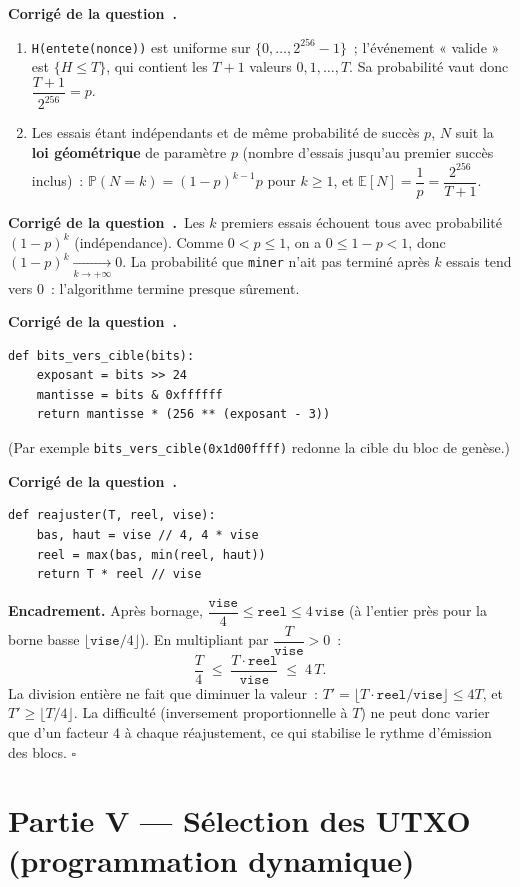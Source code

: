 \documentclass[11pt,a4paper]{article}
\newcounter{qcnt}
\newcommand{\Q}{\medskip\par\stepcounter{qcnt}\noindent\textbf{Corrigé de la question~\theqcnt.}~}
\newcommand{\code}[1]{\lstinline!#1!}
\begin{document}
\Q
\begin{enumerate}[label=(\alph*),nosep,leftmargin=1.6em]
  \item \code{H(entete(nonce))} est uniforme sur $\{0,\ldots,2^{256}-1\}$~; l'événement « valide » est $\{H\le T\}$, qui contient les $T+1$ valeurs $0,1,\ldots,T$. Sa probabilité vaut donc $\dfrac{T+1}{2^{256}} = p$.
  \item Les essais étant indépendants et de même probabilité de succès $p$, $N$ suit la \textbf{loi géométrique} de paramètre $p$ (nombre d'essais jusqu'au premier succès inclus)~: $\mathbb{P}(N=k) = (1-p)^{k-1}p$ pour $k\ge 1$, et $\mathbb{E}[N] = \dfrac{1}{p} = \dfrac{2^{256}}{T+1}$.
\end{enumerate}

\Q Les $k$ premiers essais échouent tous avec probabilité $(1-p)^{k}$ (indépendance). Comme $0<p\le 1$, on a $0\le 1-p<1$, donc $(1-p)^{k}\xrightarrow[k\to+\infty]{}0$. La probabilité que \code{miner} n'ait pas terminé après $k$ essais tend vers $0$~: l'algorithme termine presque sûrement.

\Q
\begin{lstlisting}
def bits_vers_cible(bits):
    exposant = bits >> 24
    mantisse = bits & 0xffffff
    return mantisse * (256 ** (exposant - 3))
\end{lstlisting}
(Par exemple \code{bits_vers_cible(0x1d00ffff)} redonne la cible du bloc de genèse.)

\Q
\begin{lstlisting}
def reajuster(T, reel, vise):
    bas, haut = vise // 4, 4 * vise
    reel = max(bas, min(reel, haut))
    return T * reel // vise
\end{lstlisting}
\textbf{Encadrement.} Après bornage, $\dfrac{\texttt{vise}}{4} \le \texttt{reel} \le 4\,\texttt{vise}$ (à l'entier près pour la borne basse $\lfloor\texttt{vise}/4\rfloor$). En multipliant par $\dfrac{T}{\texttt{vise}}>0$~:
\[
  \frac{T}{4} \;\le\; \frac{T\cdot \texttt{reel}}{\texttt{vise}} \;\le\; 4\,T.
\]
La division entière ne fait que diminuer la valeur~: $T' = \big\lfloor T\cdot\texttt{reel}/\texttt{vise}\big\rfloor \le 4T$, et $T' \ge \big\lfloor T/4\big\rfloor$. La difficulté (inversement proportionnelle à $T$) ne peut donc varier que d'un facteur $4$ à chaque réajustement, ce qui stabilise le rythme d'émission des blocs. \hfill$\square$

\section*{Partie V --- Sélection des UTXO (programmation dynamique)}
\end{document}
